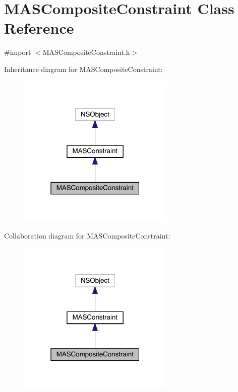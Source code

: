\hypertarget{interface_m_a_s_composite_constraint}{}\section{M\+A\+S\+Composite\+Constraint Class Reference}
\label{interface_m_a_s_composite_constraint}


{\ttfamily \#import $<$M\+A\+S\+Composite\+Constraint.\+h$>$}



Inheritance diagram for M\+A\+S\+Composite\+Constraint\+:\nopagebreak
\begin{figure}[H]
\begin{center}
\leavevmode
\includegraphics[width=211pt]{interface_m_a_s_composite_constraint__inherit__graph}
\end{center}
\end{figure}


Collaboration diagram for M\+A\+S\+Composite\+Constraint\+:\nopagebreak
\begin{figure}[H]
\begin{center}
\leavevmode
\includegraphics[width=211pt]{interface_m_a_s_composite_constraint__coll__graph}
\end{center}
\end{figure}
